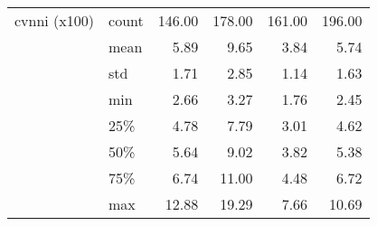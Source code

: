 \begin{tabular}{llrrrr}
cvnni (x100) & count &  146.00 &  178.00 &  161.00 &  196.00 \\
             & mean &    5.89 &    9.65 &    3.84 &    5.74 \\
             & std &    1.71 &    2.85 &    1.14 &    1.63 \\
             & min &    2.66 &    3.27 &    1.76 &    2.45 \\
             & 25\% &    4.78 &    7.79 &    3.01 &    4.62 \\
             & 50\% &    5.64 &    9.02 &    3.82 &    5.38 \\
             & 75\% &    6.74 &   11.00 &    4.48 &    6.72 \\
             & max &   12.88 &   19.29 &    7.66 &   10.69 \\
\bottomrule
\end{tabular}
